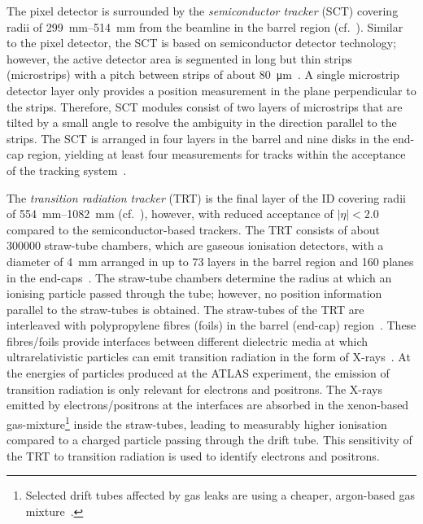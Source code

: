 The pixel detector is surrounded by the \emph{semiconductor tracker} (SCT)
covering radii of \SIrange{299}{514}{\milli\metre} from the beamline in the
barrel region (cf.\ ). Similar to the pixel
detector, the SCT is based on semiconductor detector technology; however, the
active detector area is segmented in long but thin strips (microstrips) with a
pitch between strips of about \SI{80}{\micro\metre}~\cite{PERF-2007-01}. A
single microstrip detector layer only provides a position measurement in the
plane perpendicular to the strips. Therefore, SCT modules consist of two layers
of microstrips that are tilted by a small angle to resolve the ambiguity in the
direction parallel to the strips. The SCT is arranged in four layers in the
barrel and nine disks in the end-cap region, yielding at least four measurements
for tracks within the acceptance of the tracking system~\cite{PERF-2007-01}.

The \emph{transition radiation tracker} (TRT) is the final layer of the ID
covering radii of \SIrange{554}{1082}{\milli\metre} (cf.\
), however, with reduced acceptance of
$|\eta| < 2.0$ compared to the semiconductor-based trackers. The TRT consists of
about \num{300000} straw-tube chambers, which are gaseous ionisation detectors,
with a diameter of \SI{4}{\milli\metre} arranged in up to 73 layers in the
barrel region and 160 planes in the end-caps~\cite{PERF-2007-01}. The straw-tube
chambers determine the radius at which an ionising particle passed through the
tube; however, no position information parallel to the straw-tubes is obtained.
The straw-tubes of the TRT are interleaved with polypropylene fibres (foils) in
the barrel (end-cap) region~\cite{PERF-2007-01}. These fibres/foils provide
interfaces between different dielectric media at which ultrarelativistic
particles can emit transition radiation in the form of
X-rays~\cite{Grupen:2008zz}. At the energies of particles produced at the ATLAS
experiment, the emission of transition radiation is only relevant for electrons
and positrons. The X-rays emitted by electrons/positrons at the interfaces are
absorbed in the xenon-based gas-mixture\footnote{Selected drift tubes affected
  by gas leaks are using a cheaper, argon-based gas
  mixture~\cite{IDET-2015-01}.} inside the straw-tubes, leading to measurably
higher ionisation compared to a charged particle passing through the drift
tube. This sensitivity of the TRT to transition radiation is used to identify
electrons and positrons.

